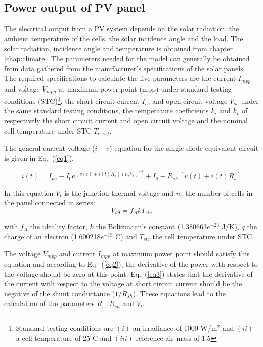 \subsection{Power output of PV panel}

The electrical output from a PV system depends on the solar radiation, the ambient temperature of the cells, the solar incidence angle and the load. The solar radiation, incidence angle and temperature is obtained from chapter \ref{chap:climate}. The parameters needed for the model can generally be obtained from data gathered from the manufacturer's specifications of the solar panels. The required specifications to calculate the five parameters are the current $I_{mpp}$ and voltage $V_{mpp}$ at maximum power point (mpp) under standard testing conditions (STC)\footnote{Standard testing conditions are $(i)$ an irradiance of 1000 W/m$^2$ and $(ii)$ a cell temperature of 25$^\circ$C and $(iii)$ reference air mass of 1.5}, the short circuit current $I_{sc}$ and open circuit voltage $V_{oc}$ under the same standard testing conditions, the temperature coefficients $k_{i}$ and $k_{v}$ of respectively the short circuit current and open circuit voltage and the nominal cell temperature under STC $T_{c,ref}$.

The general current-voltage ($i-v$) equation for the single diode equivalent circuit is given in Eq.~(\ref{eq1}). 

\begin{equation}
i(t) = I_{ph} - I_{0} e^{\left(v(t)+i(t) R_{s}\right) \left(n_{s} V_{t}\right)^{-1}} + I_{0} - R_{sh}^{-1} \left[v(t)+i(t) R_{s}\right]
\label{eq1}
\end{equation}

In this equation $V_{t}$ is the junction thermal voltage and $n_{s}$ the number of cells in the panel connected in series:
\begin{equation}
V_{t}q = f_{A} k T_{stc}
\label{eqVt}
\end{equation}

with $f_{A}$ the ideality factor, $k$ the Boltzmann's constant (1.380663$e^{-23}$ J/K), $q$ the charge of an electron (1.600218$e^{-19}$ C) and $T_{stc}$ the cell temperature under STC.

The voltage $V_{mpp}$ and current $I_{mpp}$ at maximum power point should satisfy this equation and according to Eq.~(\ref{eq2}), the derivative of the power with respect to the voltage should be zero at this point. Eq.~(\ref{eq3}) states that the derivative of the current with respect to the voltage at short circuit current should be the negative of the shunt conductance ($1/R_{sh}$). These equations lead to the calculation of the parameters $R_{s}$, $R_{sh}$ and $V_{t}$.

